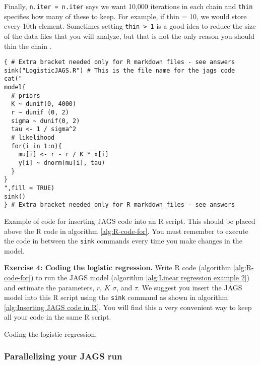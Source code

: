 \documentclass[12pt,english]{article}
\begin{document}
Finally, \texttt{n.iter = n.iter} says we want 10,000 iterations in each chain and \texttt{thin} specifies how many of these to keep. For example, if thin = 10, we would store every 10th element. Sometimes setting \texttt{thin > 1} is a good idea to reduce the size of the data files that you will analyze, but that is not the only reason you should thin the chain \citep{Link:2012ve}.

\begin{algorithm}
\begin{Verbatim}[frame=single]
{ # Extra bracket needed only for R markdown files - see answers
sink("LogisticJAGS.R") # This is the file name for the jags code
cat("
model{
  # priors
  K ~ dunif(0, 4000)
  r ~ dunif (0, 2)
  sigma ~ dunif(0, 2) 
  tau <- 1 / sigma^2
  # likelihood
  for(i in 1:n){
    mu[i] <- r - r / K * x[i]
    y[i] ~ dnorm(mu[i], tau)
  }
}  
",fill = TRUE)
sink()
} # Extra bracket needed only for R markdown files - see answers
\end{Verbatim}
\caption[Example of code for inserting JAGS code within R script]{Example of code for inserting JAGS code into an R script. This should be placed above the R code in algorithm \ref{alg:R-code-for}. You must remember to execute the code in between the \texttt{sink} commands every time you make changes in the model.}
\label{alg:Inserting JAGS code in R}
\end{algorithm}

\belowcaptionskip=-20pt
\begin{exercise}
\begin{mdframed}
\doublespacing
\textbf{Exercise 4: Coding the logistic regression.} Write R code (algorithm \ref{alg:R-code-for}) to run the JAGS model (algorithm \ref{alg:Linear regression example 2}) and estimate the parameters, $r$, $K$ $\sigma$, and $\tau$. We suggest you insert the JAGS model into this R script using the \texttt{sink} command as shown in algorithm \ref{alg:Inserting JAGS code in R}. You will find this a very convenient way to keep all your code in the same R script. 
\end{mdframed}
\captionsetup{textformat=empty, labelformat=empty}
\caption[Coding the logistic regression]{Coding the logistic regression.}
\label{ex:logistic regression sequential}
\end{exercise}
\belowcaptionskip=0pt

\newpage

\subsubsection{Parallelizing your JAGS run}
\end{document}
